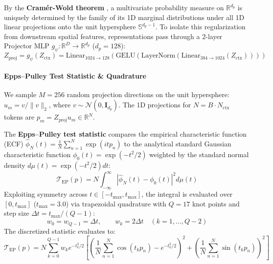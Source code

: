\documentclass{article}
\begin{document}
By the \textbf{Cram\'er-Wold theorem} \citep{cramer1936theorems}, a multivariate probability measure on $\mathbb{R}^{d_p}$ is uniquely determined by the family of its 1D marginal distributions under all 1D linear projections onto the unit hypersphere $\mathbb{S}^{d_p - 1}$. To isolate this regularization from downstream spatial features, representations pass through a 2-layer Projector MLP $g_\psi: \mathbb{R}^D \to \mathbb{R}^{d_p}$ ($d_p = 128$):
\begin{equation}
    Z_{\text{proj}} = g_\psi(Z_{\text{ctx}}) = \text{Linear}_{1024 \to 128}\left(\text{GELU}\left(\text{LayerNorm}\left(\text{Linear}_{384 \to 1024}(Z_{\text{ctx}})\right)\right)\right)
\end{equation}

\paragraph{Epps--Pulley Test Statistic \& Quadrature}
We sample $M = 256$ random projection directions on the unit hypersphere: $u_m = v / \|v\|_2$, where $v \sim \mathcal{N}(0, \mathbf{I}_{d_p})$. The 1D projections for $N = B \cdot N_{\text{ctx}}$ tokens are $p_m = Z_{\text{proj}} u_m \in \mathbb{R}^N$.

The \textbf{Epps--Pulley test statistic} \citep{epps1983test} compares the empirical characteristic function (ECF) $\hat{\phi}_N(t) = \frac{1}{N} \sum_{n=1}^N \exp(i t p_n)$ to the analytical standard Gaussian characteristic function $\phi_0(t) = \exp(-t^2 / 2)$ weighted by the standard normal density $d\mu(t) = \exp(-t^2/2) dt$:
\begin{equation}
    \mathcal{T}_{\text{EP}}(p) = N \int_{-\infty}^{\infty} |\hat{\phi}_N(t) - \phi_0(t)|^2 d\mu(t)
\end{equation}
Exploiting symmetry across $t \in [-t_{\text{max}}, t_{\text{max}}]$, the integral is evaluated over $[0, t_{\text{max}}]$ ($t_{\text{max}} = 3.0$) via trapezoidal quadrature with $Q = 17$ knot points and step size $\Delta t = t_{\text{max}} / (Q - 1)$:
\begin{equation}
    w_0 = w_{Q-1} = \Delta t, \qquad w_k = 2 \Delta t \quad (k = 1, \dots, Q-2)
\end{equation}
The discretized statistic evaluates to:
\begin{equation}
    \mathcal{T}_{\text{EP}}(p) = N \sum_{k=0}^{Q-1} w_k e^{-t_k^2/2} \left[ \left( \frac{1}{N} \sum_{n=1}^N \cos(t_k p_n) - e^{-t_k^2/2} \right)^2 + \left( \frac{1}{N} \sum_{n=1}^N \sin(t_k p_n) \right)^2 \right]
\end{equation}
\end{document}
